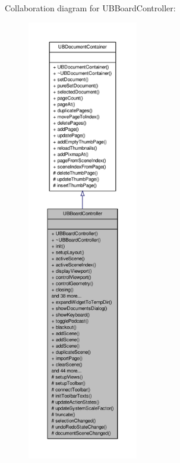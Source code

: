 Collaboration diagram for U\-B\-Board\-Controller\-:
\nopagebreak
\begin{figure}[H]
\begin{center}
\leavevmode
\includegraphics[height=550pt]{df/d56/class_u_b_board_controller__coll__graph}
\end{center}
\end{figure}
